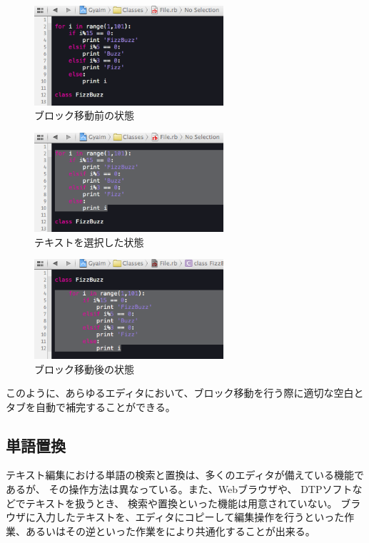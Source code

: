 \begin{figure}[H]
\centerline{\includegraphics[width=70mm,bb=0 0 360 190]{figures/indent1.png}}
\caption{ブロック移動前の状態}
\label{indent1}
\end{figure}

\begin{figure}[H]
\centerline{\includegraphics[width=70mm,bb=0 0 360 190]{figures/indent2.png}}
\caption{テキストを選択した状態}
\label{indent2}
\end{figure}

\begin{figure}[H]
\centerline{\includegraphics[width=70mm,bb=0 0 360 190]{figures/indent3.png}}
\caption{ブロック移動後の状態}
\label{indent3}
\end{figure}

このように、あらゆるエディタにおいて、ブロック移動を行う際に適切な空白とタブを自動で補完することができる。

\subsection{単語置換}
テキスト編集における単語の検索と置換は、多くのエディタが備えている機能であるが、
その操作方法は異なっている。また、Webブラウザや、
DTPソフトなどでテキストを扱うとき、
検索や置換といった機能は用意されていない。
ブラウザに入力したテキストを、エディタにコピーして編集操作を行うといった作業、あるいはその逆といった作業を{\system}により共通化することが出来る。

